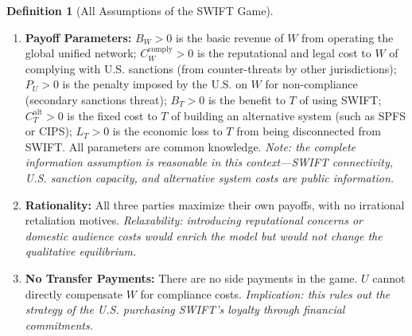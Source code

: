 \documentclass[12pt,a4paper]{article}
\theoremstyle{definition}
\newtheorem{definition}{Definition}[section]
\theoremstyle{remark}
\begin{document}
\begin{definition}[All Assumptions of the SWIFT Game]
\label{def:swift-assumptions}
\begin{enumerate}[label=\textbf{S\arabic*}, leftmargin=*, itemsep=4pt]
\item \textbf{Payoff Parameters:} $B_W > 0$ is the basic revenue of $W$ from operating the global unified network; $C_W^{\text{comply}} > 0$ is the reputational and legal cost to $W$ of complying with U.S. sanctions (from counter-threats by other jurisdictions); $P_U > 0$ is the penalty imposed by the U.S. on $W$ for non-compliance (secondary sanctions threat); $B_T > 0$ is the benefit to $T$ of using SWIFT; $C_T^{\text{alt}} > 0$ is the fixed cost to $T$ of building an alternative system (such as SPFS or CIPS); $L_T > 0$ is the economic loss to $T$ from being disconnected from SWIFT. All parameters are common knowledge. \hfill\textit{Note: the complete information assumption is reasonable in this context---SWIFT connectivity, U.S. sanction capacity, and alternative system costs are public information.}
\item \textbf{Rationality:} All three parties maximize their own payoffs, with no irrational retaliation motives. \hfill\textit{Relaxability: introducing reputational concerns or domestic audience costs would enrich the model but would not change the qualitative equilibrium.}
\item \textbf{No Transfer Payments:} There are no side payments in the game. $U$ cannot directly compensate $W$ for compliance costs. \hfill\textit{Implication: this rules out the strategy of the U.S. purchasing SWIFT's loyalty through financial commitments.}
\end{enumerate}
\end{definition}
\end{document}
